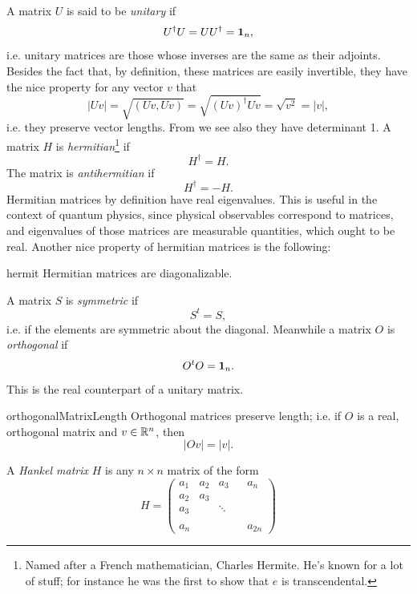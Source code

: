 A matrix $U$ is said to be {\it unitary} if
\begin{equation}\label{eq:unitary}
U^\dagger U=UU^\dagger={\mathbf 1}_n,
\end{equation}
i.e. unitary matrices are those whose inverses are the same as
their adjoints. Besides the fact that, by definition, these
matrices are easily invertible, they have the nice property 
for any vector $v$ that
\begin{equation}
|Uv|=\sqrt{(Uv,Uv)}=\sqrt{(Uv)^\dagger Uv}=\sqrt{v^2}=|v|,
\end{equation}
i.e. they preserve vector lengths. From
 we see also they have determinant 1.
  A matrix $H$ is {\it hermitian}\footnote{Named
after a French mathematician, Charles Hermite. He's known
for a lot of stuff; for instance he was the first to
show that $e$ is transcendental.} if
\begin{equation}
H^\dagger=H. 
\end{equation}
The matrix is {\it antihermitian} if
\begin{equation}
H^\dagger=-H. 
\end{equation}
Hermitian matrices by definition have real eigenvalues.
This is useful in the context of quantum physics, since physical observables
correspond to matrices, and eigenvalues of those matrices are measurable
quantities, which ought to be real.
Another nice property of hermitian matrices is the following:

\begin{theorem}{}{hermit}
  Hermitian matrices are diagonalizable.
\end{theorem}

A matrix $S$ is {\it symmetric} if
\begin{equation}
S^t=S,
\end{equation}
i.e. if the elements are symmetric about the diagonal.
Meanwhile a matrix $O$ is {\it orthogonal} if 
\begin{equation}
O^tO={\mathbf 1}_n.
\end{equation}
This is
the real counterpart of a unitary matrix. 
\begin{proposition}{}{orthogonalMatrixLength}
Orthogonal matrices preserve length; i.e. if $O$ is
a real, orthogonal matrix and $v\in\mathbb{R}^n$, then 
$$
|Ov|=|v|.
$$
\end{proposition}

A {\it Hankel matrix} $H$ is any $n\times n$ matrix of the form
\begin{equation}
H=\begin{pmatrix}
  a_1 & a_2 & a_3 &  & a_n  \\
  a_2 & a_3 &     &  & \\
  a_3 &     & \ddots &  &  \\ 
      &     &     &  &  \\
  a_n &     &     &  & a_{2n}
\end{pmatrix}
\end{equation}

